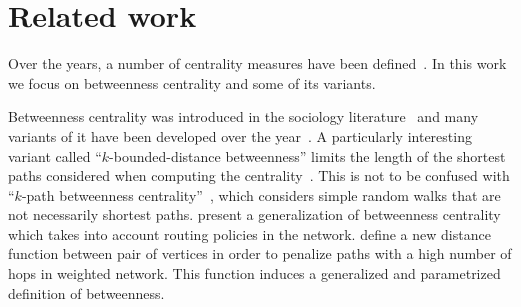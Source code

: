 \section{Related work}\label{sec:prevwork}
Over the years, a number of centrality measures have been defined~\citep{Newman10}. In this work
we focus on betweenness centrality and some of its variants. 

Betweenness centrality was introduced in the sociology
literature~\citep{Anthonisse71,Freeman77} and many variants of it have been
developed over the year~\citet{Brandes08}. A particularly interesting variant
called ``$k$-bounded-distance betweenness'' limits the length of the shortest
paths considered when computing the
centrality~\citep{BorgattiE06,Brandes08,PfefferC12}. This is not to be confused
with ``$k$-path betweenness centrality''~\citep{KourtellisASIT12}, which
considers simple random walks that are not necessarily shortest paths.
\citet{DolevEP10} present a generalization of betweenness centrality which takes
into account routing policies in the network. \citet{OpsahlAS10} define a new
distance function between pair of vertices in order to penalize paths with a
high number of hops in weighted network. This function induces a generalized and
parametrized definition of betweenness.


